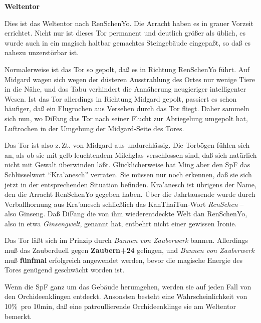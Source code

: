 \documentclass[
a4paper,
twoside,
DIV=calc,
BCOR=4mm,
fontsize=9pt,
twocolumn=on,
titlepage=on,
parskip=half
]{scrartcl}
\begin{document}
\textbf{ Weltentor}


Dies ist das Weltentor nach RenSchenYo. Die Arracht haben es in grauer
Vorzeit errichtet. Nicht nur ist dieses Tor permanent und deutlich
größer als üblich, es wurde auch in ein magisch haltbar gemachtes
Steingebäude eingepaßt, so daß es nahezu unzerstörbar ist.

Normalerweise ist das Tor so gepolt, daß es in Richtung RenSchenYo
führt. Auf Midgard wagen sich wegen der düsteren Ausstrahlung des
Ortes nur wenige Tiere in die Nähe, und das Tabu verhindert die
Annäherung neugieriger intelligenter Wesen. Ist das Tor allerdings in
Richtung Midgard gepolt, passiert es schon häufiger, daß ein
Flugrochen aus Versehen durch das Tor fliegt. Daher sammeln sich nun,
wo DiFang das Tor nach seiner Flucht zur Abriegelung umgepolt hat,
Luftrochen in der Umgebung der Midgard-Seite des Tores.

Das Tor ist also z.\,Zt. von Midgard aus undurchlässig. Die Torbögen
fühlen sich an, als ob sie mit gelb leuchtendem Milchglas verschlossen
sind, daß sich natürlich nicht mit Gewalt überwinden
läßt. Glücklicherweise hat Ming aber den SpF das Schlüsselwort
"`Kra'anesch"' verraten. Sie müssen nur noch erkennen, daß sie sich
jetzt in der entsprechenden Situation befinden. Kra'anesch ist
übrigens der Name, den die Arracht RenSchenYo gegeben haben. Über die
Jahrtausende wurde durch Verballhornung aus Kra'anesch schließlich das
KanThaiTun-Wort \emph{RenSchen} -- also Ginseng. Daß DiFang die von
ihm wiederentdeckte Welt dan RenSchenYo, also in etwa
\emph{Ginsengwelt}, genannt hat, entbehrt nicht einer gewissen Ironie.

Das Tor läßt sich im Prinzip durch \emph{Bannen von Zauberwerk}
bannen. Allerdings muß das Zauberduell gegen \textbf{Zaubern+24}
gelingen, und \emph{Bannen von Zauberwerk} muß \textbf{fünfmal}
erfolgreich angewendet werden, bevor die magische Energie des Tores
genügend geschwächt worden ist.

Wenn die SpF ganz um das Gebäude herumgehen, werden sie auf jeden Fall
von den Orchideenklingen entdeckt. Ansonsten besteht eine
Wahrscheinlichkeit von 10\%\ pro 10min, daß eine patroullierende
Orchideenklinge sie am Weltentor bemerkt.
\end{document}
